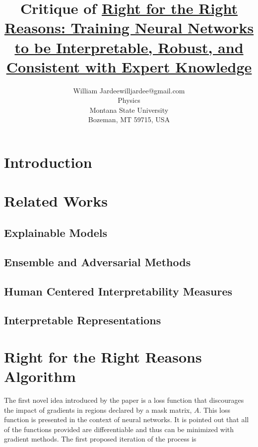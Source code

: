 \documentclass[twoside,11pt]{article}
\begin{document}
\title{Critique of \ul{Right for the Right Reasons: Training Neural Networks to be Interpretable, Robust, and Consistent with Expert Knowledge}}

\author{\name William Jardee\email willjardee@gmail.com \\
       \addr Physics\\
       Montana State University\\
       Bozeman, MT 59715, USA
       }
\editor{\,}

\maketitle
 
\section{Introduction}


\section{Related Works}
\subsection{Explainable Models}
\subsection{Ensemble and Adversarial Methods}
\subsection{Human Centered Interpretability Measures}
\subsection{Interpretable Representations}


\section{Right for the Right Reasons Algorithm}
The first novel idea introduced by the paper is a loss function that discourages the impact of gradients in regions declared by a mask matrix, $A$. This loss function is presented in the context of neural networks. It is pointed out that all of the functions provided are differentiable and thus can be minimized with gradient methods. The first proposed iteration of the process is 
\end{document}
